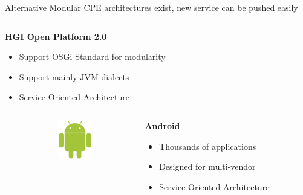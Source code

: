\documentclass[a4paper]{beamer}
\begin{document}
\begin{frame}{Alternative Modular CPE architectures exist, new service can be pushed easily}
\begin{columns}[T]
																										
		\begin{column}[T]{0.70 \textwidth} 
																																							
																																								   
			\textbf{ HGI Open Platform 2.0}
			\begin{itemize}
				\item Support OSGi Standard for modularity
				\item Support mainly JVM dialects
				\item Service Oriented Architecture
			\end{itemize}
			\vspace{3mm}
																																								     
																																							
		\end{column}
																										
	\end{columns}
						
						
	\begin{columns}[T]
		\begin{column}{.01\textwidth} %
																	
		\end{column}
		\begin{column}[T]{0.15 \textwidth} 
			\vspace{1em}
			\includegraphics[width=4em]{droid.png}
		\end{column}
																						
																										
		\begin{column}[T]{0.70 \textwidth} 
																																							
																																								   
			\textbf{ Android}
			\begin{itemize}
				\item Thousands of applications
				\item Designed for multi-vendor
				\item Service Oriented Architecture
			\end{itemize}
			\vspace{5mm}
																																								     

\end{column}
\end{columns}
\end{frame}
\end{document}
